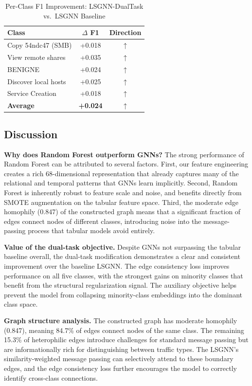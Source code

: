 \documentclass[conference]{IEEEtran}
\begin{document}
\begin{table}[t]
\centering
\caption{Per-Class F1 Improvement: LSGNN-DualTask vs.\ LSGNN Baseline}
\label{tab:improvement}
\begin{tabular}{@{}lcc@{}}
\toprule
\textbf{Class} & \textbf{$\Delta$ F1} & \textbf{Direction} \\
\midrule
Copy 54ndc47 (SMB)   & +0.018 & $\uparrow$ \\
View remote shares   & +0.035 & $\uparrow$ \\
BENIGNE              & +0.024 & $\uparrow$ \\
Discover local hosts & +0.025 & $\uparrow$ \\
Service Creation     & +0.018 & $\uparrow$ \\
\midrule
\textbf{Average}     & \textbf{+0.024} & $\uparrow$ \\
\bottomrule
\end{tabular}
\end{table}

\subsection{Discussion}

\textbf{Why does Random Forest outperform GNNs?} The strong performance of Random Forest can be attributed to several factors. First, our feature engineering creates a rich 68-dimensional representation that already captures many of the relational and temporal patterns that GNNs learn implicitly. Second, Random Forest is inherently robust to feature scale and noise, and benefits directly from SMOTE augmentation on the tabular feature space. Third, the moderate edge homophily (0.847) of the constructed graph means that a significant fraction of edges connect nodes of different classes, introducing noise into the message-passing process that tabular models avoid entirely.

\textbf{Value of the dual-task objective.} Despite GNNs not surpassing the tabular baseline overall, the dual-task modification demonstrates a clear and consistent improvement over the baseline LSGNN. The edge consistency loss improves performance on all five classes, with the strongest gains on minority classes that benefit from the structural regularization signal. The auxiliary objective helps prevent the model from collapsing minority-class embeddings into the dominant class space.

\textbf{Graph structure analysis.} The constructed graph has moderate homophily (0.847), meaning 84.7\% of edges connect nodes of the same class. The remaining 15.3\% of heterophilic edges introduce challenges for standard message passing but are informationally rich for distinguishing between traffic types. The LSGNN's similarity-weighted message passing can selectively attend to these boundary edges, and the edge consistency loss further encourages the model to correctly identify cross-class connections.
\end{document}
